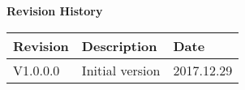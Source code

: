 \large{\bf{Revision History}}
\begin{table}[ht]
	\small
	\begin{tabular}{|L{2.2cm}|L{10.16cm}|L{3.87cm}|}
	\hline
		Revision & Description & Date \\
	\hline
	V1.0.0.0& Initial version & 2017.12.29\\
	\hline
	\end{tabular}
\end{table}
